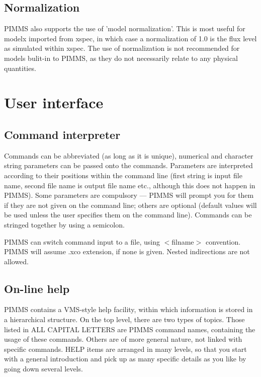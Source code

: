 \documentclass[11pt]{article}
\begin{document}
\subsection{Normalization}

PIMMS also supports the use of 'model normalization'.  This is most useful
for modelx imported from xspec, in which case a normalization of 1.0 is
the flux level as simulated within xspec.  The use of normalization is not
recommended for models bulit-in to PIMMS, as they do not necessarily relate
to any physical quantities.

\section{User interface}

\subsection{Command interpreter}

Commands  can  be  abbreviated  (as  long  as it  is  unique),  numerical  and
character  string  parameters can  be passed onto  the commands.    Parameters
are  interpreted  according   to  their  positions  within  the  command  line 
(first string is input file name,  second file name is  output file name etc.,
although this does  not happen in PIMMS).   Some parameters  are compulsory 
--- PIMMS  will prompt  you  for  them if they are not given on the 
command line;
others are optional  (default values will  be used unless  the user  specifies
them  on the  command  line).   Commands can  be stringed  together by using a
semicolon.

PIMMS can switch command input to a file, using \@$<$filname$>$ convention.
PIMMS will assume .xco extension, if none is given.  Nested indirections
are not allowed.

\subsection{On-line help}

PIMMS contains a VMS-style help facility, within which
information is  stored in a hierarchical structure.   On the top level,
there are two types of topics.   Those listed in ALL CAPITAL LETTERS are PIMMS
command names,  containing the usage  of these commands.    Others are of more
general nature, not linked with specific commands.  HELP items are arranged in
many levels, so that you start with a general introduction and pick up as many
specific details as you like by going down several levels.
\end{document}
